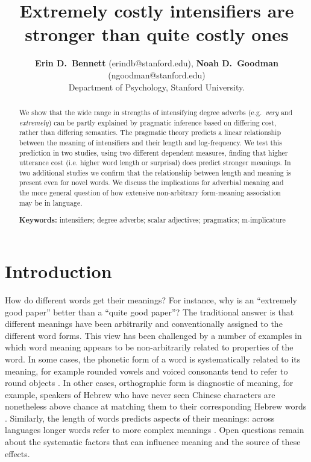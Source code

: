 \documentclass[10pt,letterpaper]{article}
\title{Extremely costly intensifiers are stronger than quite costly ones}
\author{{\large \bf Erin D.~Bennett} (erindb@stanford.edu), {\large \bf Noah D.~Goodman} (ngoodman@stanford.edu)\\
  Department of Psychology, Stanford University.}
\newcommand{\w}[1]{\emph{#1}}
\begin{document}
\maketitle

\begin{abstract}

We show that the wide range in strengths of intensifying degree adverbs (e.g.~\w{very} and \w{extremely}) can be partly explained by pragmatic inference based on differing cost, rather than differing semantics.
The pragmatic theory predicts a linear relationship between the meaning of intensifiers and their length and log-frequency.
We test this prediction in two studies, using two different dependent measures, finding that higher utterance cost (i.e. higher word length or surprisal) does predict stronger meanings.
In two additional studies we confirm that the relationship between length and meaning is present even for novel words.
We discuss the implications for adverbial meaning and the more general question of how extensive non-arbitrary form-meaning association may be in language.

\textbf{Keywords:} 
intensifiers; degree adverbs; scalar adjectives; pragmatics; m-implicature
\end{abstract}

\section{Introduction}

How do different words get their meanings?
For instance, why is an ``extremely good paper'' better than a ``quite good paper''?
The traditional answer \cite{de_saussure_nature_1916} is that different meanings have been arbitrarily and conventionally assigned to the different word forms.
This view has been challenged by a number of examples in which word meaning appears to be non-arbitrarily related to properties of the word.
In some cases, the phonetic form of a word is systematically related to its meaning, for example rounded vowels and voiced consonants tend to refer to round objects \cite{kohler_gestalt_1970, ramachandran_synaesthesiawindow_2001, holland_physiognomic_1964, davis_fitness_1961}.
In other cases, orthographic form is diagnostic of meaning, for example, speakers of Hebrew who have never seen Chinese characters are nonetheless above chance at matching them to their corresponding Hebrew words \cite{koriat_figural_1979}.
Similarly, the length of words predicts aspects of their meanings: across languages longer words refer to more complex meanings \cite{lewis_conceptual_2016}.
Open questions remain about the systematic factors that can influence meaning and the source of these effects.
\end{document}
